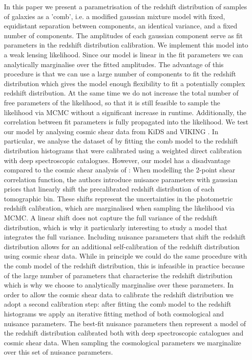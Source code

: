 \documentclass{aa}
\begin{document}
In this paper we present a parametrisation of the redshift distribution of samples of galaxies as a 'comb', i.e. a modified gaussian mixture model with fixed, equidistant separation between components, an identical variance, and a fixed number of components. The amplitudes of each gaussian component serve as fit parameters in the redshift distribution calibration. We implement this model into a weak lensing likelihood. Since our model is linear in the fit parameters we can analytically marginalise over the fitted amplitudes. The advantage of this procedure is that we can use a large number of components to fit the redshift distribution which gives the model enough flexibility to fit a potentially complex redshift distribution. At the same time we do not increase the total number of free parameters of the likelihood, so that it is still feasible to sample the likelihood via MCMC without a significant increase in runtime. Additionally, the correlation between fit parameters is fully propagated into the likelihood.
We test our model by analysing cosmic shear data from KiDS  \citep[Kilo Degree Survey;][]{2015MNRAS.454.3500K,2015A&A...582A..62D,2017A&A...604A.134D} and VIKING \citep[VISTA Kilo-Degree Infrared Galaxy Survey;][]{2013Msngr.154...32E}. In particular, we analyse the dataset of \cite{hildebrandt18} by fitting the comb model to the redshift distribution histograms that were calibrated using a weighted direct calibration with deep spectroscopic catalogues.
However, our model has a disadvantage compared to the cosmic shear analysis of  \cite{hildebrandt18}: When modelling the 2-point shear correlation function, the authors introduce nuisance parameters with gaussian priors that linearly shift the precalibrated redshift distribution of each tomographic bin. These shifts represent the uncertainties in the photometric redshift calibration, which are marginalised when sampling the likelihood via MCMC. A linear shift does not capture the full variance of the redshift distribution, which is why it particularly interesting to study a model that integrates the full variance. Including nuisance parameters that shift the redshift distribution allows for an additional self-calibration of the redshift distribution using cosmic shear data. While in principle we could do the same procedure with the comb model of the redshift distribution, this is infeasible in practice because of the large number of parameters that characterise the redshift distribution which is why we choose to analytically marginalise over these parameters. In order to allow the cosmic shear data to calibrate the redshift distribution we adopt a second calibration step: after fitting the comb model to the redshift histograms we apply an iterative fitting method of both cosmological and nuisance parameters. The best-fit nuisance parameters then represent a model of the redshift distribution calibrated both with deep spectroscopic catalogues and cosmic shear data. When sampling the cosmological parameters we marginalize over this set of nuisance parameters.
 
\end{document}
